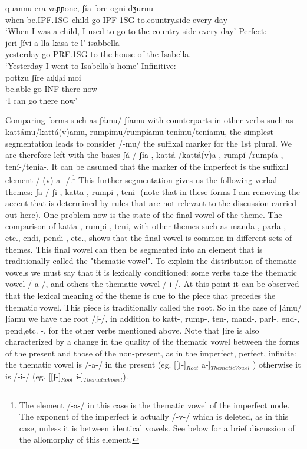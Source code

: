 \documentclass[output=paper]{langscibook}
\begin{document}
    \gll      quannu era    vaɲɲone, ʃía      fore    ogni dʒurnu\\
     when be.IPF.1SG child  go-IPF-1SG to.country.side every day\\
     \glt ‘When I was a child, I used to go to the country side every day’
    \ex  \label{ac24c}Perfect: \\
    \gll jeri      ʃívi      a lla  kasa   te l’ isabbella\\
     yesterday  go-PRF.1SG to the house of the Isabella.\\
    \glt ‘Yesterday I went to Isabella’s home’
    \ex \label{ac24d}Infinitive: \\
     \gll pottzu  ʃíre    aɖɖai  moi\\
     be.able go-INF  there now\\
     \glt ‘I can go there now’
    \z
\z

Comparing forms such as ʃámu/ ʃíamu with counterparts in other verbs such as  kattámu/kattá(v)amu, rumpímu/rumpíamu tenímu/teníamu, the simplest segmentation leads to consider /-mu/ the suffixal marker for the 1st plural. We are therefore left with the bases  ʃá-/ ʃía-, kattá-/kattá(v)a-, rumpí-/rumpía-, tení-/tenía-.  It can be assumed that the marker of the imperfect is  the suffixal element /-(v)-a- /.\footnote{The element /-a-/ in this case is the thematic vowel of the imperfect node.  The exponent of the imperfect is actually /-v-/ which is deleted, as in this case, unless it is between identical vowels.  See below for a brief discussion of the allomorphy of this element.} This further segmentation gives us the following verbal themes:  ʃa-/ ʃi-, katta-, rumpi-, teni-  (note that in these forms I am removing the accent that is determined by rules that are not relevant to the discussion carried out here). One problem now is the state of the final vowel of the theme. The comparison of  katta-, rumpi-, teni, with other themes such as  manda-, parla-, etc.,  endi, pendi-,  etc., shows that the final vowel is common in different sets of  themes.  This final vowel can then be segmented into an element that is traditionally called  the  "thematic vowel". To explain the distribution of thematic vowels we must say that it is lexically  conditioned:  some verbs take the thematic  vowel  /-a-/, and others the thematic vowel  /-i-/. At this point it can be observed that the lexical meaning of the  theme  is  due to the piece that precedes the thematic vowel. This piece is traditionally called the root. So in the case of ʃámu/ ʃíamu  we have the root /ʃ-/, in addition to  katt-, rump-, ten-, mand-, parl-, end-, pend,etc. -,  for the other verbs mentioned above.  Note that  ʃire  is also characterized by a change in the quality of the thematic vowel between the forms of the present and those of the non-present, as in the imperfect, perfect, infinite: the thematic vowel is /-a-/ in the present  (eg. [[ʃ-]$_{Root}$  a-]$_{Thematic Vowel}$ ) otherwise it is  /-i-/ (eg. [[ʃ-]$_{Root}$  i-]$_{ThematicVowel}$).
\end{document}
